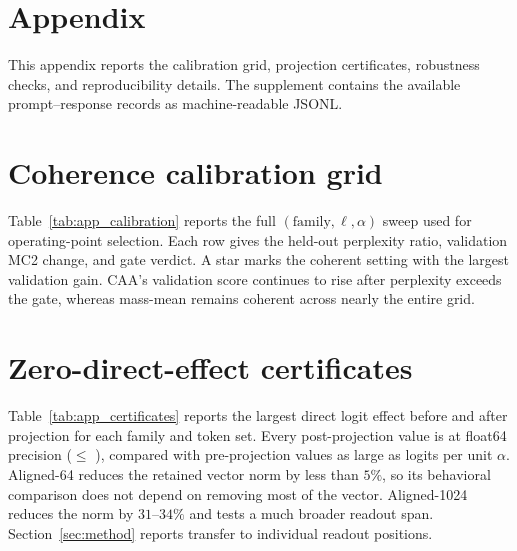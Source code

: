 \appendix
\section*{Appendix}

This appendix reports the calibration grid, projection certificates, robustness checks, and reproducibility details. The supplement contains the available prompt--response records as machine-readable JSONL.

\section{Coherence calibration grid}\label{app:calibration}

Table~\ref{tab:app_calibration} reports the full $(\text{family}, \ell, \alpha)$ sweep used for operating-point selection. Each row gives the held-out perplexity ratio, validation MC2 change, and gate verdict. A star marks the coherent setting with the largest validation gain. CAA's validation score continues to rise after perplexity exceeds the gate, whereas mass-mean remains coherent across nearly the entire grid.

\begin{table}[h]
\centering
\small

\caption{Full coherence-calibration grid. $^{\star}$ marks the selected operating point. ``coherent?'' is the gate verdict (perplexity ratio $\le 1.5$). Figure~\ref{fig:calibration} plots these values.}
\label{tab:app_calibration}
\end{table}

\section{Zero-direct-effect certificates}\label{app:certificates}

Table~\ref{tab:app_certificates} reports the largest direct logit effect before and after projection for each family and token set. Every post-projection value is at float64 precision ($\le$ \CertWorst{}), compared with pre-projection values as large as \CertPre{} logits per unit $\alpha$. Aligned-64 reduces the retained vector norm by less than $5\%$, so its behavioral comparison does not depend on removing most of the vector. Aligned-1024 reduces the norm by $31$--$34\%$ and tests a much broader readout span. Section~\ref{sec:method} reports transfer to individual readout positions.

\begin{table}[h]
\centering
\small

\caption{Zero-direct-effect certificates in float64. ``before'' and ``after'' are the maximum direct effects on the set for the unprojected and projected vectors. Random controls do not target the readout and are omitted.}
\label{tab:app_certificates}
\end{table}


